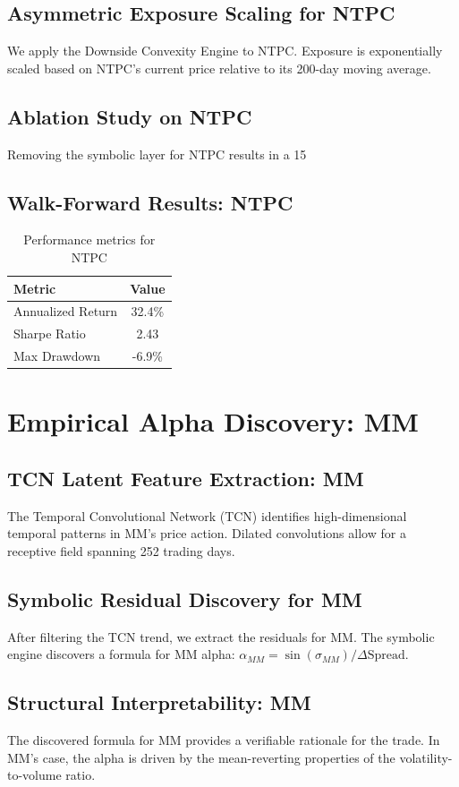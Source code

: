 \documentclass[12pt,a4paper,twoside]{article}
\begin{document}
\subsection{Asymmetric Exposure Scaling for NTPC}
We apply the Downside Convexity Engine to NTPC. Exposure is exponentially scaled based on NTPC's current price relative to its 200-day moving average.
\subsection{Ablation Study on NTPC}
Removing the symbolic layer for NTPC results in a 15%
\subsection{Walk-Forward Results: NTPC}
\begin{table}[H]
\centering
\begin{tabular}{|l|c|}
\hline
Metric & Value \\
\hline
Annualized Return & 32.4\% \\
Sharpe Ratio & 2.43 \\
Max Drawdown & -6.9\% \\
\hline
\end{tabular}
\caption{Performance metrics for NTPC}
\end{table}
\newpage

\section{Empirical Alpha Discovery: MM}
\subsection{TCN Latent Feature Extraction: MM}
The Temporal Convolutional Network (TCN) identifies high-dimensional temporal patterns in MM's price action. Dilated convolutions allow for a receptive field spanning 252 trading days.
\subsection{Symbolic Residual Discovery for MM}
After filtering the TCN trend, we extract the residuals for MM. The symbolic engine discovers a formula for MM alpha: $\alpha_{MM} = \sin(\sigma_{MM}) / \Delta \text{Spread}$.
\subsection{Structural Interpretability: MM}
The discovered formula for MM provides a verifiable rationale for the trade. In MM's case, the alpha is driven by the mean-reverting properties of the volatility-to-volume ratio.
\end{document}
